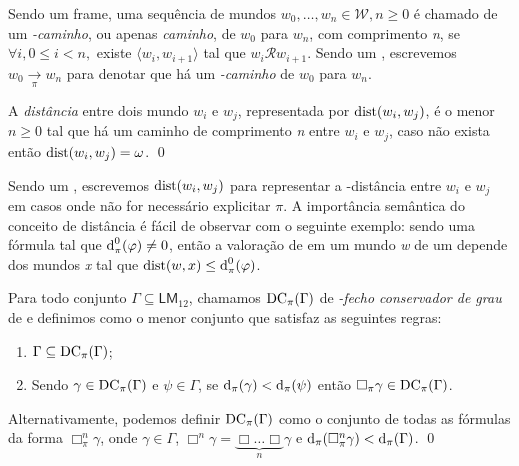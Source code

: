             \begin{definicao}
                Sendo  um frame, uma sequência de mundos \(w_0, \dots, w_n \in \mathcal{W}, n \geq 0\) é
                chamado de um \textit{-caminho}, ou apenas \textit{caminho}, de \(w_0\) para \(w_n\), com comprimento \textit{n},
                se \(\forall i, 0 \leq i < n,\) existe \(\langle w_i, w_{i+1} \rangle\) tal que \(w_i \mathcal{R} w_{i+1}\).
                Sendo  um \PIframe, escrevemos \(w_0 \xrightarrow[\pi]{} w_n\) para denotar que há um \textit{-caminho}
                de \(w_0\) para \(w_n\).

                A \textit{distância} entre dois mundo \(w_i\) e \(w_j\), representada por \(\operatorname{dist}(w_i, w_j)\), é o menor \(n \geq 0\) tal que há um caminho
                de comprimento \textit{n} entre \(w_i\) e \(w_j\), caso não exista então \(\operatorname{dist}(w_i, w_j) = \omega\). \qed
            \end{definicao}

            Sendo  um \PIframe, escrevemos \(\operatorname{dist}(w_i, w_j)\) para representar a \PI-distância entre \(w_i\) e \(w_j\) em casos onde não for necessário
            explicitar \(\pi\). A importância semântica do conceito de distância é fácil de observar com o seguinte exemplo: sendo \PHI uma fórmula tal
            que \(\operatorname{d}^{0}_{\pi}(\varphi) \neq 0\), então a valoração de \PHI em um mundo \textit{w} de um \PImodelo {} depende dos mundos \textit{x} tal que
            \(\operatorname{dist}(w, x) \leq \operatorname{d}^{0}_{\pi}(\varphi)\).

            \begin{definicao}
                \label{def:FechoModal}
                Para todo conjunto \(\Gamma \subseteq \mathsf{LM}_{12}\), chamamos \(\operatorname{DC}_{\pi}(\Gamma)\) de \textit{\BOXi{\pi}-fecho conservador de grau} de \GAMMA
                e definimos como o menor conjunto que satisfaz as seguintes regras:
                \begin{enumerate}
                    \item \(\Gamma \subseteq \operatorname{DC}_{\pi}(\Gamma)\);
                    \item Sendo \(\gamma \in \operatorname{DC}_{\pi}(\Gamma)\) e \(\psi \in \Gamma\), se \(\operatorname{d}_{\pi}(\gamma) < \operatorname{d}_{\pi}(\psi)\) então \(\Box_{\pi} \gamma \in \operatorname{DC}_{\pi}(\Gamma)\).
                \end{enumerate}
                Alternativamente, podemos definir \(\operatorname{DC}_{\pi}(\Gamma)\) como o conjunto de todas as fórmulas da forma \(\Box^{n}_{\pi} \gamma\), onde \(\gamma \in \Gamma\),
                \(\Box^{n} \gamma = \underbrace{\Box \dots \Box}_{n} \gamma \) e \(\operatorname{d}_{\pi}(\Box^{n}_{\pi}\gamma) < \operatorname{d}_{\pi}(\Gamma)\). \qed
            \end{definicao}

